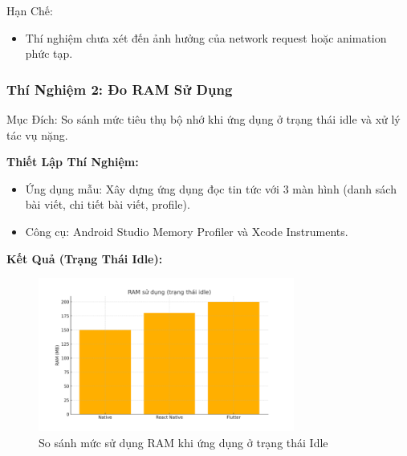 \begin{flushleft}
  \hspace*{0.8cm}Hạn Chế:
  \setlength{\leftmargini}{1.5cm}
  \begin{itemize}
      \item Thí nghiệm chưa xét đến ảnh hưởng của network request hoặc animation phức tạp.
  \end{itemize}
\end{flushleft}

\subsubsection{Thí Nghiệm 2: Đo RAM Sử Dụng}
    \begin{flushleft}
      \hspace*{0.8cm}Mục Đích: So sánh mức tiêu thụ bộ nhớ khi ứng dụng ở trạng thái idle và xử lý tác vụ nặng.
    \end{flushleft}

    \begin{flushleft}
      \hspace*{0.8cm}\textbf{Thiết Lập Thí Nghiệm:}
      \setlength{\leftmargini}{1.5cm}
      \begin{itemize}
        \item Ứng dụng mẫu: Xây dựng ứng dụng đọc tin tức với 3 màn hình (danh sách bài viết, chi tiết bài viết, profile).
        \item Công cụ: Android Studio Memory Profiler và Xcode Instruments.
      \end{itemize}
    \end{flushleft}
    
    \vspace{0.5em}
    
    \begin{flushleft}
      \hspace*{0.8cm}\textbf{Kết Quả (Trạng Thái Idle):}
    \end{flushleft}
    
    \begin{figure}[H]
        \centering
        \includegraphics[width=0.75\textwidth]{images/idle_memory_usage.png}
        \caption{So sánh mức sử dụng RAM khi ứng dụng ở trạng thái Idle}
    \end{figure}
    

